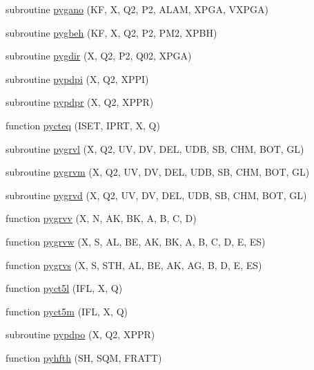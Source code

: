 \begin{DoxyCompactItemize}
subroutine \hyperlink{pythia-6_84_824_8f_a055632fad3ca0e02e8fd6c3e1111633d}{pygano} (K\+F, X, Q2, P2, A\+L\+A\+M, X\+P\+G\+A, V\+X\+P\+G\+A)
\item 
subroutine \hyperlink{pythia-6_84_824_8f_af5ad5b58bca45571f9326336c1b90006}{pygbeh} (K\+F, X, Q2, P2, P\+M2, X\+P\+B\+H)
\item 
subroutine \hyperlink{pythia-6_84_824_8f_ae6cda6b3b8fc088943d6e62ea2b46fa3}{pygdir} (X, Q2, P2, Q02, X\+P\+G\+A)
\item 
subroutine \hyperlink{pythia-6_84_824_8f_a531404f3c78f1a46663578aced4e7949}{pypdpi} (X, Q2, X\+P\+P\+I)
\item 
subroutine \hyperlink{pythia-6_84_824_8f_a50867d0838ac3bac097f6b5ebad0367e}{pypdpr} (X, Q2, X\+P\+P\+R)
\item 
function \hyperlink{pythia-6_84_824_8f_ac6605825fa66747684fd87ed3dd04c29}{pycteq} (I\+S\+E\+T, I\+P\+R\+T, X, Q)
\item 
subroutine \hyperlink{pythia-6_84_824_8f_a9536da5c1a25003eb2b4660ee140aae3}{pygrvl} (X, Q2, U\+V, D\+V, D\+E\+L, U\+D\+B, S\+B, C\+H\+M, B\+O\+T, G\+L)
\item 
subroutine \hyperlink{pythia-6_84_824_8f_a74cd930f8d1b849e1d3411d2a0f7513a}{pygrvm} (X, Q2, U\+V, D\+V, D\+E\+L, U\+D\+B, S\+B, C\+H\+M, B\+O\+T, G\+L)
\item 
subroutine \hyperlink{pythia-6_84_824_8f_a09a7ba7614c769f663607fa14028547f}{pygrvd} (X, Q2, U\+V, D\+V, D\+E\+L, U\+D\+B, S\+B, C\+H\+M, B\+O\+T, G\+L)
\item 
function \hyperlink{pythia-6_84_824_8f_aa24b26bd99e9077506224df51d31969a}{pygrvv} (X, N, A\+K, B\+K, A, B, C, D)
\item 
function \hyperlink{pythia-6_84_824_8f_a62fd74a25057f05b80687923b03c660e}{pygrvw} (X, S, A\+L, B\+E, A\+K, B\+K, A, B, C, D, E, E\+S)
\item 
function \hyperlink{pythia-6_84_824_8f_a3d0f3f88ce64951c60d9af8b21bd67a6}{pygrvs} (X, S, S\+T\+H, A\+L, B\+E, A\+K, A\+G, B, D, E, E\+S)
\item 
function \hyperlink{pythia-6_84_824_8f_a4f37f9344270ad52d136ebb5a849ad4e}{pyct5l} (I\+F\+L, X, Q)
\item 
function \hyperlink{pythia-6_84_824_8f_a3ad7f72b08000107702cb296d607a0b9}{pyct5m} (I\+F\+L, X, Q)
\item 
subroutine \hyperlink{pythia-6_84_824_8f_a605143159514e85a1ef178afc6ce14fc}{pypdpo} (X, Q2, X\+P\+P\+R)
\item 
function \hyperlink{pythia-6_84_824_8f_a9963904e560eddd173e584b94c1651a1}{pyhfth} (S\+H, S\+Q\+M, F\+R\+A\+T\+T)

\end{DoxyCompactItemize}
